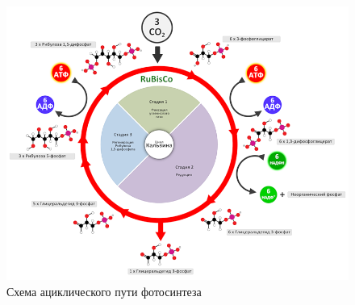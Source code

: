 \begin{figure}
  \centering
       \includegraphics[width=0.6\linewidth]{pictures/calvin}
\caption{Схема ациклического пути фотосинтеза}
\label{calvin}
\end{figure}


